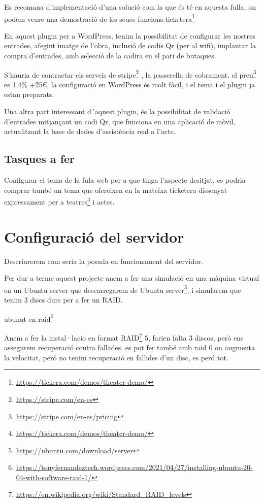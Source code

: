 \documentclass[
  10pt,
]{krantz}
\DeclareRobustCommand{\href}[2]{#2\footnote{\url{#1}}}
\begin{document}
Es recomana d'implementació d'una solució com la que és té en aquesta fulla, on podem veure una demostració de les seues funcions.\href{https://tickera.com/demos/theater-demo/}{ticketera}

En aquest plugin per a WordPress, tenim la possibilitat de configurar les nostres entrades, afegint imatge de l'obra, inclusió de codis Qr (per al wifi), implantar la compra d'entrades, amb selecció de la cadira en el pati de butaques.

S'hauria de contractar els serveis de \href{https://stripe.com/en-es}{stripe} , la passerella de cobrament. el \href{https://stripe.com/en-es/pricing}{preu} es 1,4\% +25€, la configuració en WordPress és molt fàcil, i el tema i el plugin ja estan preparats.

Una altra part interessant d´aquest plugin, és la possibilitat de validació d'entrades mitjançant un codi Qr, que funciona en una aplicació de mòvil, actualitzant la base de dades d'assistència real a l'acte.

\hypertarget{tasques-a-fer}{%
\section{Tasques a fer}\label{tasques-a-fer}}

Configurar el tema de la fula web per a que tinga l'aspecte desitjat, es podria comprar també un tema que ofereixen en la mateixa ticketera dissenyat expressament per a \href{https://tickera.com/demos/theater-demo/}{teatres} i actes.

\hypertarget{configuraciuxf3-del-servidor}{%
\chapter{Configuració del servidor}\label{configuraciuxf3-del-servidor}}

Descriurerem com seria la posada en funcionament del servidor.

Per dur a terme aquest projecte anem a fer una simulació en una màquina virtual en un Ubuntu server que descarregarem de \href{https://ubuntu.com/download/server}{Ubuntu server}. i simularem que tenim 3 discs durs per a fer un RAID.

\href{https://tonyfernandeztech.wordpress.com/2021/04/27/installing-ubuntu-20-04-with-software-raid-1/}{ubunut en raid}

Anem a fer la instal·lacio en format \href{https://en.wikipedia.org/wiki/Standard_RAID_levels}{RAID} 5, farien falta 3 discos, però ens assegurem recuperació contra fallades, es pot fer també amb raid 0 on augmenta la velocitat, però no tenim recuperació en fallides d'un disc, es perd tot.
\end{document}
